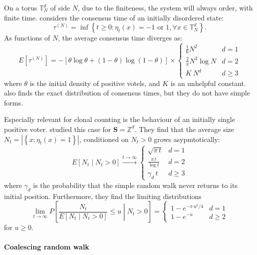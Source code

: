 \documentclass[10pt,english]{report}
\begin{document}
On a torus $\mathbb{T}_N^d$ of side $N$, due to the finiteness, the system will always order, with finite time. \citet{voterconsensus} considers the consensus time of an initially disordered state: $$\tau^{(N)} = \inf \left\{ t \ge 0 : \eta_t(x) = \textrm{$-1$ or $1$}, \forall x \in \mathbb{T}_N^d \right\}.$$ As functions of $N$, the average consensus time diverges as:
\begin{equation*}
E\left[\tau^{(N)}\right] = -\left[\theta \log \theta + (1-\theta) \log (1-\theta) \right]\times\begin{cases}
\frac{1}{6} N^2           & d = 1 \\
\frac{2}{\pi} N^2 \log N  & d = 2 \\
K~N^d                     & d \ge 3
\end{cases}
\end{equation*}
where $\theta$ is the initial density of positive votels, and $K$ is an unhelpful constant. \citet{voterconsensus} also finds the exact distribution of consensus times, but they do not have simple forms.

Especially relevant for clonal counting is the behaviour of an initially single positive voter. \citet{bramson&griffeath} studied this case for $\mathbf{S} = \mathbb{Z}^d$. They find that the average size $N_t = \left| \left\{x: \eta_t(x) = 1\right\} \right|$, conditioned on $N_t > 0$ grows asypmtotically:
\begin{equation*}
E\left[N_t\middle|N_t>0\right] \overset{t \rightarrow \infty}{\longrightarrow} \begin{cases}
\sqrt{\pi\,t}         & d = 1 \\
\frac{\pi\,t}{\log t} & d = 2 \\
\gamma_d\,t           & d \ge 3
\end{cases}
\end{equation*}
where $\gamma_d$ is the probability that the simple random walk never returns to its initial position. Furthermore, they find the limiting distributions
\begin{equation*}
\lim_{t\rightarrow\infty} P\left[\frac{N_t}{E\left[N_t\middle|N_t>0\right]} \le u \middle| N_t > 0\right] = \begin{cases}
1 - e^{-\pi\,u^2/4} & d = 1 \\
1 - e^{-u}     & d \ge 2
\end{cases}
\end{equation*} for $u \ge 0$.

\paragraph{Coalescing random walk}
\end{document}
